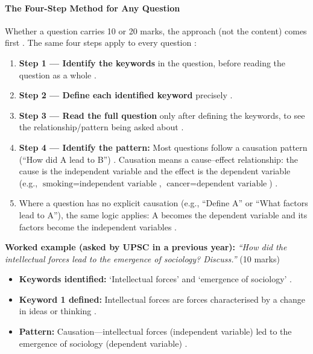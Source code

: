 \paragraph{The Four-Step Method for Any Question}
Whether a question carries 10 or 20 marks, the approach (not the content) comes first . The same four steps apply to every question :
\begin{enumerate}
    \item \textbf{Step 1 --- Identify the keywords} in the question, before reading the question as a whole .
    \item \textbf{Step 2 --- Define each identified keyword} precisely .
    \item \textbf{Step 3 --- Read the full question} only after defining the keywords, to see the relationship/pattern being asked about .
    \item \textbf{Step 4 --- Identify the pattern:} Most questions follow a causation pattern (``How did A lead to B'') . Causation means a cause--effect relationship: the cause is the independent variable and the effect is the dependent variable (e.g., $\text{smoking} = \text{independent variable}$, $\text{cancer} = \text{dependent variable}$) .
    \item Where a question has no explicit causation (e.g., ``Define A'' or ``What factors lead to A''), the same logic applies: A becomes the dependent variable and its factors become the independent variables .
\end{enumerate}

\begin{PYQLink}
\textbf{Worked example (asked by UPSC in a previous year):} \textit{``How did the intellectual forces lead to the emergence of sociology? Discuss.''} (10 marks) 
\begin{itemize}
    \item \textbf{Keywords identified:} `Intellectual forces' and `emergence of sociology' .
    \item \textbf{Keyword 1 defined:} Intellectual forces are forces characterised by a change in ideas or thinking .
    \item \textbf{Pattern:} Causation---intellectual forces (independent variable) led to the emergence of sociology (dependent variable) .
\end{itemize}
\end{PYQLink}

